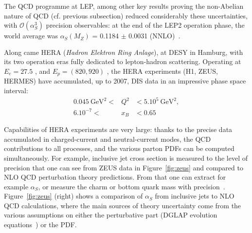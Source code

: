 The QCD programme at LEP, among other key results proving the
non-Abelian nature of QCD (cf. previous subsection) reduced
considerably these uncertainties, with $\mathcal{O}(\alpha_{S}^{3})$
precision observables: at the end of the LEP2 operation phase, the
world average was $\alpha_{S}(M_{Z})$ = 0.1184 $\pm$ 0.0031
(NNLO)~\cite{Kogler}.

Along came HERA (\textit{Hadron Elektron Ring Anlage}), at DESY in
Hamburg, with its two operation eras fully dedicated to lepton-hadron
scattering. Operating at $E_{e} = 27.5$ \GeV, and $E_{p} = (820, 920)$
\GeV, the HERA experiments (H1, ZEUS, HERMES) have accumulated, up to
2007, DIS data in an impressive phase space interval:
\begin{eqnarray*}
0.045 \: \textrm{GeV}^{2} <& Q^{2} &< 5.10^{5} \: \textrm{GeV}^{2}, \\
6. 10^{-7} <& x_{B} &< 0.65
\end{eqnarray*}

Capabilities of HERA experiments are very large: thanks to the
precise data accumulated in charged-current and neutral-current modes,
the QCD contributions to all processes, and the various parton PDFs can be computed
simultaneously. For example, inclusive jet cross section is measured
to the level of precision that one can see from ZEUS data in
Figure~\ref{fig:zeus} and compared to NLO QCD perturbation theory predictions. From that one
can extract for example $\alpha_{S}$, or measure the charm or bottom
quark mass with precision~\cite{H1Charm}. Figure~\ref{fig:zeus} (right) shows a
comparison of $\alpha_{S}$ from inclusive jets to NLO QCD
calculations, where the main sources of theory uncertainty come from
the various assumptions on either the perturbative part (DGLAP
evolution equations~\cite{Dokshitzer:1991wu}) or the PDF. 


